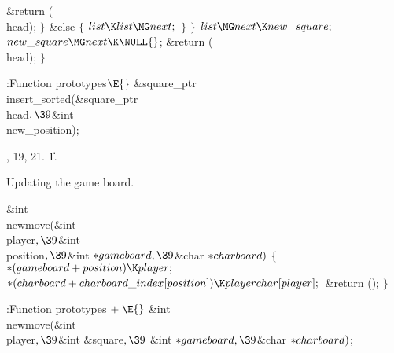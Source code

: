 \&{return} (\\{head});\6
\4${}\}{}$\2\6
\&{else}\5
${}\{{}$\1\6
${}\\{list}\K\\{list}\MG\\{next};{}$\6
\4${}\}{}$\2\6
\4${}\}{}$\2\6
${}\\{list}\MG\\{next}\K\\{new\_square};{}$\6
${}\\{new\_square}\MG\\{next}\K\NULL{}$;\6
\&{return} (\\{head});\6
\4${}\}{}$\2\par
\fi

\B{}:Function prototypes\X${}\E{}$\6
\&{square\_ptr} \\{insert\_sorted}(\&{square\_ptr} \\{head}${},\39{}$\&{int} %
\\{new\_position});\par
{}, 19, 21.
\U1.\fi

Updating the game board.

\Y\B\&{int} \\{newmove}(\&{int} \\{player}${},\39{}$\&{int} \\{position}${},%
\39{}$\&{int} ${}{*}\\{gameboard},\39{}$\&{char} ${}{*}\\{charboard}){}$\1\1\2%
\2\6
${}\{{}$\1\6
${}{*}(\\{gameboard}+\\{position})\K\\{player};{}$\6
${}{*}(\\{charboard}+\\{charboard\_index}[\\{position}])\K\\{playerchar}[%
\\{player}];{}$\6
\&{return} ();\6
\4${}\}{}$\2\par
\fi

\B{}:Function prototypes\X${}\mathrel+\E{}$\6
\&{int} \\{newmove}(\&{int} \\{player}${},\39{}$\&{int} \&{square}${},\39{}$%
\&{int} ${}{*}\\{gameboard},\39{}$\&{char} ${}{*}\\{charboard}){}$;\par
\fi

